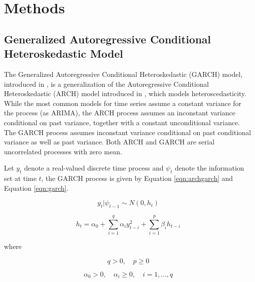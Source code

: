 \documentclass[cic,tc, english]{iiufrgs}
\begin{document}
    \begin{comment}
        On ten of October 2015 a impeachment request for president Dilma Rousseff was handed to the Chamber Of Representatives' president, who accepted the request on December second. The opening of the impeachment process was accepted by the special impeachment committee on eleven of April 2016.
    \end{comment}

\section{Methods} \label{chapter_methods}

\subsection{Generalized Autoregressive Conditional Heteroskedastic Model}

    The Generalized Autoregressive Conditional Heteroskedastic (GARCH) model, introduced in \citet{bollerslev1986}, is a generalization of the Autoregressive Conditional Heteroskedastic (ARCH) model introduced in \citet{engle1982}, which models heteroscedasticity. While the most common models for time series assume a constant variance for the process (as ARIMA), the ARCH process assumes an inconstant variance conditional on past variance, together with a constant unconditional variance. The GARCH process assumes inconstant variance conditional on past conditional variance as well as past variance. Both ARCH and GARCH are serial uncorrelated processes with zero mean.

    Let $y_t$ denote a real-valued discrete time process and $\psi_t$ denote the information set at time $t$,  the GARCH process is given by Equation \ref{eqn:archgarch} and Equation \ref{eqn:garch}.

    \begin{equation}
        \label{eqn:archgarch}
        y_t | \psi_{t-1} \sim N(0,h_t)
    \end{equation}

    \begin{equation}
        \label{eqn:garch}
        h_t = \alpha_0 + \displaystyle\sum_{i=1}^{q} \alpha_i y_{t-i}^2 + \displaystyle\sum_{i=1}^{p} \beta_i h_{t-i}
    \end{equation}

    where

    $$q > 0, \quad   p \geq 0$$

    $$\alpha_0 > 0, \quad  \alpha_i \geq 0, \quad  i=1,...,q$$
\end{document}
